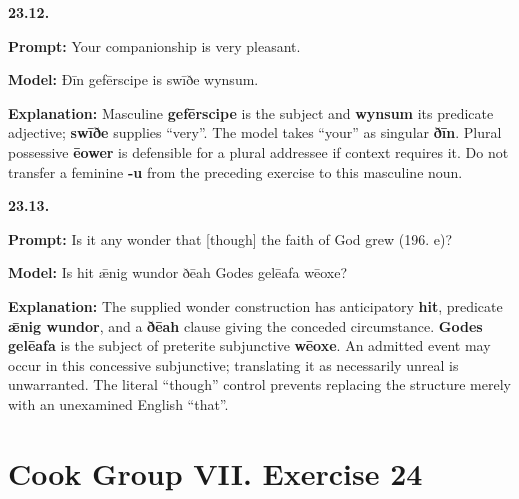 \par\begin{minipage}{\linewidth}\raggedright
\textbf{23.12.}

\textbf{Prompt:} Your companionship is very pleasant.

\textbf{Model:} Ðīn gefērscipe is swīðe wynsum.

\textbf{Explanation:} Masculine \textbf{gefērscipe} is the subject and \textbf{wynsum} its predicate adjective; \textbf{swīðe} supplies “very”. The model takes “your” as singular \textbf{ðīn}. Plural possessive \textbf{ēower} is defensible for a plural addressee if context requires it. Do not transfer a feminine \textbf{-u} from the preceding exercise to this masculine noun.

\end{minipage}\par\addvspace{4pt}

\par\begin{minipage}{\linewidth}\raggedright
\textbf{23.13.}

\textbf{Prompt:} Is it any wonder that [though] the faith of God grew (196. e)?

\textbf{Model:} Is hit ǣnig wundor ðēah Godes gelēafa wēoxe?

\textbf{Explanation:} The supplied wonder construction has anticipatory \textbf{hit}, predicate \textbf{ǣnig wundor}, and a \textbf{ðēah} clause giving the conceded circumstance. \textbf{Godes gelēafa} is the subject of preterite subjunctive \textbf{wēoxe}. An admitted event may occur in this concessive subjunctive; translating it as necessarily unreal is unwarranted. The literal “though” control prevents replacing the structure merely with an unexamined English “that”.

\end{minipage}\par\addvspace{4pt}

\section*{Cook Group VII. Exercise 24}

